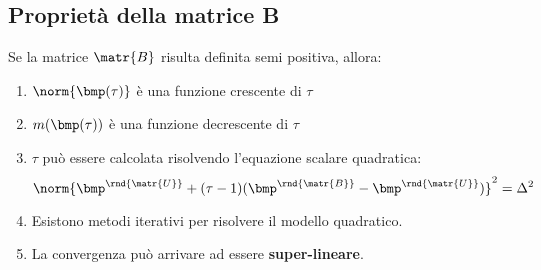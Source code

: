 \documentclass[\main/main.tex]{subfiles}
\begin{document}
\subsection{Proprietà della matrice B}
Se la matrice \(\matr{B}\) risulta definita semi positiva, allora:

\begin{enumerate}
    \item \(\norm{\bmp(\tau)}\) è una funzione crescente di \(\tau \)
    \item \(m(\bmp(\tau))\) è una funzione decrescente di \(\tau \)
    \item \(\tau \) può essere calcolata risolvendo l'equazione scalare quadratica: \[
              \norm{\bmp^{\rnd{\matr{U}}} + (\tau -1)(\bmp^{\rnd{\matr{B}}}-\bmp^{\rnd{\matr{U}}})}^2 = \Delta^2
          \]    \item Esistono metodi iterativi per risolvere il modello quadratico.
    \item La convergenza può arrivare ad essere \textbf{super-lineare}.
\end{enumerate}
\end{document}
